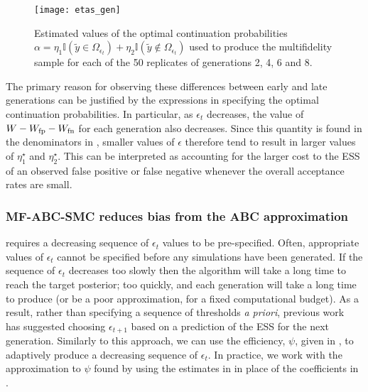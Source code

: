 \documentclass[review]{siamonline190516}
\begin{document}
\begin{figure}
\centering
\texttt{[image: etas\_gen]}
\caption{
Estimated values of the optimal continuation probabilities $\alpha = \eta_1 \mathbb I(\tilde y \in \Omega_{\epsilon_t}) + \eta_2 \mathbb I(\tilde y \notin \Omega_{\epsilon_t})$ used to produce the multifidelity sample for each of the 50 replicates of generations 2, 4, 6 and 8.
}
\label{fig:etas}
\end{figure}

The primary reason for observing these differences between early and late generations can be justified by the expressions in  specifying the optimal continuation probabilities.
In particular, as $\epsilon_t$ decreases, the value of $W - W_{\mathrm{fp}} - W_{\mathrm{fn}}$ for each generation also decreases.
Since this quantity is found in the denominators in , smaller values of $\epsilon$ therefore tend to result in larger values of $\eta_1^\star$ and $\eta_2^\star$.
This can be interpreted as accounting for the larger cost to the ESS of an observed false positive or false negative whenever the overall acceptance rates are small.

\subsubsection{MF-ABC-SMC reduces bias from the ABC approximation}
\label{s:Adaptive}

 requires a decreasing sequence of $\epsilon_t$ values to be pre-specified.
Often, appropriate values of $\epsilon_t$ cannot be specified before any simulations have been generated.
If the sequence of $\epsilon_t$ decreases too slowly then the algorithm will take a long time to reach the target posterior; too quickly, and each generation will take a long time to produce (or be a poor approximation, for a fixed computational budget).
As a result, rather than specifying a sequence of thresholds \emph{a priori}, previous work~\cite{DelMoral2012} has suggested choosing $\epsilon_{t+1}$ based on a prediction of the ESS for the next generation.
Similarly to this approach, we can use the efficiency, $\psi$, given in , to adaptively produce a decreasing sequence of $\epsilon_t$.
In practice, we work with the approximation to $\psi$ found by using the estimates in  in place of the coefficients in .
\end{document}

